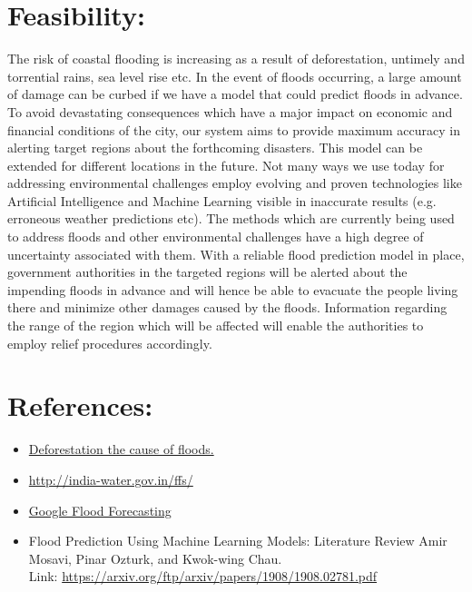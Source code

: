 \documentclass{article}
\begin{document}
	\section*{Feasibility:}
		The risk of coastal flooding is increasing as a result of deforestation, untimely and torrential rains, sea level rise etc. In the event of floods occurring, a large amount of damage can be curbed if we have a model that could predict floods in advance. To avoid devastating consequences which have a major impact on economic and financial conditions of the city, our system aims to provide maximum accuracy in alerting target regions about the forthcoming disasters. This model can be extended for different locations in the future.
Not many ways we use today for addressing environmental challenges employ evolving and proven technologies like Artificial Intelligence and Machine Learning visible in inaccurate results (e.g. erroneous weather predictions etc).  The methods which are currently being used to address floods and other environmental challenges have a high degree of uncertainty associated with them.
With a reliable flood prediction model in place, government authorities in the targeted regions will be alerted about the impending floods in advance and will hence be able to evacuate the people living there and minimize other damages caused by the floods. Information regarding the range of the region which will be affected will enable the authorities to employ relief procedures accordingly.

        \section*{References:}
        \begin{itemize}
        \item \href{https://www.thestar.com.my/opinion/letters/2014/11/08/deforestation-the-cause-of-flood}{Deforestation the cause of floods.}
        \item \url{http://india-water.gov.in/ffs/}
        \item \href{https://ai.googleblog.com/2019/03/a-summary-of-google-flood-forecasting.html}{Google Flood Forecasting}
        \item Flood Prediction Using Machine Learning Models: Literature Review Amir Mosavi, Pinar                                    Ozturk, and Kwok-wing Chau.
             \\Link: \url{https://arxiv.org/ftp/arxiv/papers/1908/1908.02781.pdf}
         \end{itemize}
\end{document}
